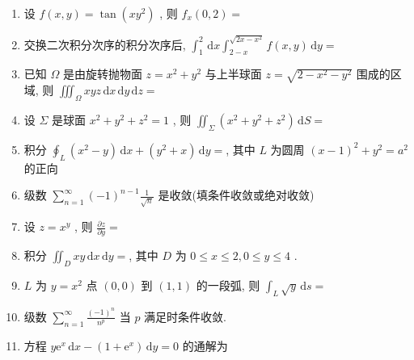 \documentclass[cn,11pt,fancy,hide]{elegantbook}
\newcommand{\ee}{\mathrm{e}}
\newcommand{\dd}{\,\mathrm{d}}
\renewcommand{\leq}{\leqslant}
\begin{document}
\begin{enumerate}
	\item 设 $f(x, y)=\tan \left(x y^{2}\right)$ , 则 $f_{x}(0,2)=$\underline{\hspace{8pc}}
	
	\item  交换二次积分次序的积分次序后, $\int_{1}^{2} \dd x \int_{2-x}^{\sqrt{2 x-x^{2}}} f(x, y) \dd y=$\underline{\hspace{8pc}}
	
	\item  已知 $\Omega$ 是由旋转抛物面 $z=x^{2}+y^{2}$ 与上半球面 $z=\sqrt{2-x^{2}-y^{2}}$ 围成的区域, 则 $\iiint_{\Omega} x y z \dd x \dd y \dd z=$\underline{\hspace{8pc}}
	
	\item  设 $\Sigma$ 是球面 $x^{2}+y^{2}+z^{2}=1$ , 则 $\iint_{\Sigma}\left(x^{2}+y^{2}+z^{2}\right) \dd S=$\underline{\hspace{8pc}}
	
	\item 积分 $\oint_{L}\left(x^{2}-y\right) \dd x+\left(y^{2}+x\right) \dd y=$\underline{\hspace{8pc}}, 其中 $L$ 为圆周 $(x-1)^{2}+y^{2}=a^{2}$ 的正向
	
	\item 级数 $\sum_{n=1}^{\infty}(-1)^{n-1} \frac{1}{\sqrt{n}}$ 是\underline{\hspace{8pc}}收敛(填条件收敛或绝对收敛)
	
	\item 设 $z=x^{y}$ , 则 $\frac{\partial z}{\partial y}=$\underline{\hspace{8pc}}
	
	\item 积分 $\iint_{D} x y \dd x \dd y=$\underline{\hspace{8pc}}, 其中 $D$ 为 $0 \leq x \leq 2, 0 \leq y \leq 4$ .
	
	\item $L$ 为 $y=x^2$ 点 $(0,0)$ 到 $(1,1)$ 的一段弧, 则 $\int_{L} \sqrt{y} \dd s=$\underline{\hspace{8pc}}
	
	\item 级数 $\sum_{n=1}^{\infty} \frac{(-1)^{n}}{n^{p}}$ 当 $p$ 满足\underline{\hspace{8pc}}时条件收敛.
	
	\item 方程 $y \ee^{x} \dd x-\left(1+\ee^{x}\right) \dd y=0$ 的通解为\underline{\hspace{8pc}}
	

\end{enumerate}
\end{document}
